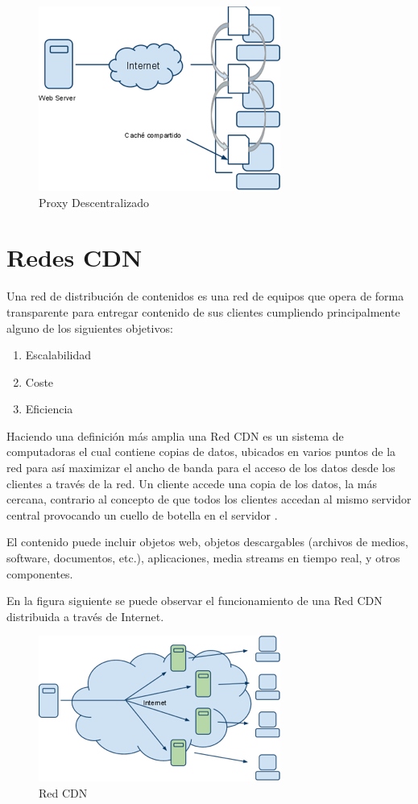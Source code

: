 \begin{figure}[h]
  \centering
    \includegraphics[scale=1]{gfx/proxy_descentralizado}
  \caption{Proxy Descentralizado}
  \label{conexionhttp}
\end{figure}

\section{Redes CDN}
Una red de distribución de contenidos es una red de equipos que opera de forma transparente para entregar contenido de sus clientes cumpliendo principalmente alguno de los siguientes objetivos:
\begin{enumerate}
\item Escalabilidad
\item Coste
\item Eficiencia
\end{enumerate}

Haciendo una definición más amplia una Red CDN es un sistema de computadoras el cual contiene copias de datos, ubicados en varios puntos de la red para así maximizar el ancho de banda para el acceso de los datos desde los clientes a través de la red. Un cliente accede una copia de los datos, la más cercana, contrario al concepto de que todos los clientes accedan al mismo servidor central provocando un cuello de botella en el servidor \cite{wiki_cdn}.

El contenido puede incluir objetos web, objetos descargables (archivos de medios, software, documentos, etc.), aplicaciones, media streams en tiempo real, y otros componentes.

En la figura siguiente se puede observar el funcionamiento de una Red CDN distribuida a través de Internet.

\begin{figure}[h]
  \centering
    \includegraphics[scale=1]{gfx/redes_cdn}
  \caption{Red CDN}
  \label{conexionhttp}
\end{figure}

